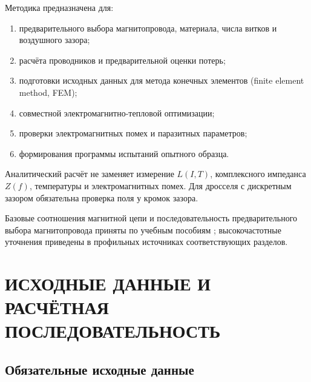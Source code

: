 \documentclass[14pt,a4paper]{extarticle}
\begin{document}
Методика предназначена для:

\begin{enumerate}
\item предварительного выбора магнитопровода, материала, числа витков и
воздушного зазора;
\item расчёта проводников и предварительной оценки потерь;
\item подготовки исходных данных для метода конечных элементов
(finite element method, FEM);
\item совместной электромагнитно-тепловой оптимизации;
\item проверки электромагнитных помех и паразитных параметров;
\item формирования программы испытаний опытного образца.
\end{enumerate}

Аналитический расчёт не заменяет измерение $L(I,T)$, комплексного импеданса
$Z(f)$, температуры и электромагнитных помех. Для дросселя с дискретным
зазором обязательна проверка поля у кромок зазора.

Базовые соотношения магнитной цепи и последовательность предварительного
выбора магнитопровода приняты по учебным пособиям
\cite{obrusnik,legostaev}; высокочастотные уточнения приведены в профильных
источниках соответствующих разделов.

\section{ИСХОДНЫЕ ДАННЫЕ И РАСЧЁТНАЯ ПОСЛЕДОВАТЕЛЬНОСТЬ}
\label{sec:inputs}

\subsection{Обязательные исходные данные}
\end{document}
